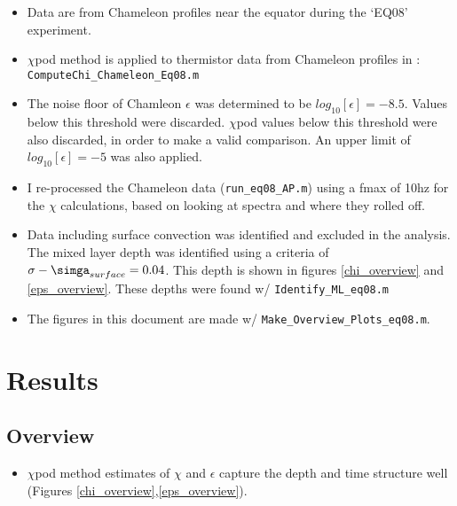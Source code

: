 \documentclass[11pt]{article}
\begin{document}
\begin{itemize}

\item Data are from Chameleon profiles near the equator during the `EQ08' experiment.

\item $\chi$pod method is applied to thermistor data from Chameleon profiles in : \verb+ComputeChi_Chameleon_Eq08.m+

\item The noise floor of Chamleon $\epsilon$ was determined to be $log_{10}[\epsilon]=-8.5$. Values below this threshold were discarded. $\chi$pod values below this threshold were also discarded, in order to make a valid comparison. An upper limit of $log_{10}[\epsilon]=-5$ was also applied.

\item I re-processed the Chameleon data (\verb+run_eq08_AP.m+) using a fmax of 10hz for the $\chi$ calculations, based on looking at spectra and where they rolled off.

\item Data including surface convection was identified and excluded in the analysis. The mixed layer depth was identified using a criteria of $\sigma -\simga_{surface}=0.04$. This depth is shown in figures \ref{chi_overview} and \ref{eps_overview}. These depths were found w/ \verb+Identify_ML_eq08.m+

\item  The figures in this document are made w/ \verb+Make_Overview_Plots_eq08.m+.

\end{itemize}







\clearpage
\section{Results}




\subsection{Overview}


\begin{itemize}

\item $\chi$pod method estimates of $\chi$ and $\epsilon$ capture the depth and time structure well (Figures \ref{chi_overview},\ref{eps_overview}).

\end{itemize}
\end{document}
